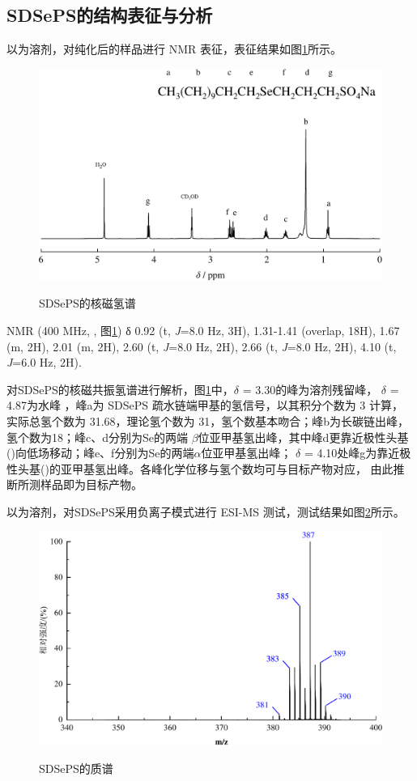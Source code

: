 \documentclass[bachelor,winfonts,replaceperiod]{jnuthesis}
\begin{document}
    \subsection{SDSePS的结构表征与分析}
    以为溶剂，对纯化后的样品进行 NMR 表征，表征结果如图\ref{fig:SDSePS-nmr}所示。
    \begin{figure}[htbp]
        \centering
        \includegraphics[width=.7\textwidth]{figure/SDSePS-nmr.pdf}\\
        \caption{SDSePS的核磁氢谱}\label{fig:SDSePS-nmr}
    \end{figure}
     
     NMR (400 MHz, , 图\ref{fig:SDSePS-nmr}) δ 0.92 (t, \textit{J}=8.0 Hz, 3H), 1.31-1.41 (overlap, 18H), 
    1.67 (m, 2H), 2.01 (m, 2H), 2.60 (t, \textit{J}=8.0 Hz, 2H), 2.66 (t, \textit{J}=8.0 Hz, 2H),  4.10 (t, \textit{J}=6.0 Hz, 2H).
    
    对SDSePS的核磁共振氢谱进行解析，图\ref{fig:SDSePS-nmr}中，$\delta$ = 3.30的峰为溶剂残留峰，
    $\delta$ = 4.87为水峰\cite{波谱解析} ，峰a为 SDSePS 疏水链端甲基的氢信号，以其积分个数为 3 计算，
    实际总氢个数为 31.68，理论氢个数为 31，氢个数基本吻合；峰b为长碳链出峰，氢个数为18；峰c、d分别为Se的两端
    $\beta$位亚甲基氢出峰\cite{徐辉碧1994,reich1978}，其中峰d更靠近极性头基()向低场移动；峰e、f分别为Se的两端$\alpha$位亚甲基氢出峰；
    $\delta$ = 4.10处峰g为靠近极性头基()的亚甲基氢出峰。各峰化学位移与氢个数均可与目标产物对应，
    由此推断所测样品即为目标产物。
    
    以为溶剂，对SDSePS采用负离子模式进行 ESI-MS 测试，测试结果如图\ref{fig:SDSePS-mass}所示。
     \begin{figure}[htbp]
        \centering
        \includegraphics[width=.7\textwidth]{figure/SDSePS-mass.pdf}\\
        \caption{SDSePS的质谱}\label{fig:SDSePS-mass}
    \end{figure}
    
\end{document}
